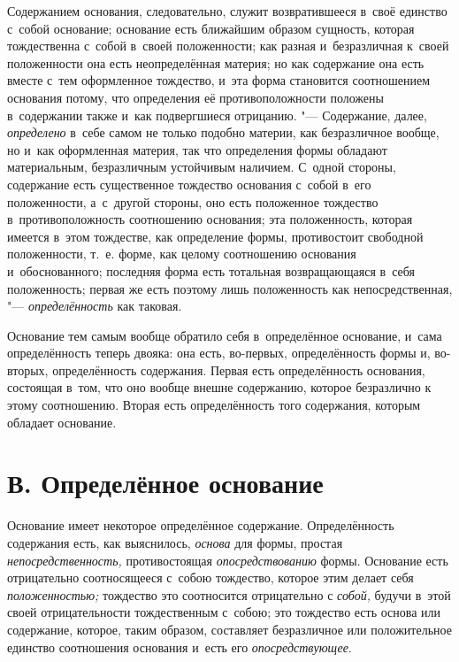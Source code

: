 Содержанием основания, следовательно, служит возвратившееся в~своё единство
с~собой основание; основание есть ближайшим образом сущность, которая
тождественна с~собой в~своей положенности; как разная и~безразличная к~своей
положенности она есть неопределённая материя; но как содержание она есть вместе
с~тем оформленное тождество, и~эта форма становится соотношением основания
потому, что определения её противоположности положены в~содержании также и~как
подвергшиеся отрицанию. "--- Содержание, далее, {\em определено} в~себе самом
не только подобно материи, как безразличное вообще, но и~как оформленная
материя, так что определения формы обладают материальным, безразличным
устойчивым наличием. С~одной стороны, содержание есть существенное тождество
основания с~собой в~его положенности, а~с~другой стороны, оно есть положенное
тождество в~противоположность соотношению основания; эта положенность, которая
имеется в~этом тождестве, как определение формы, противостоит свободной
положенности, т.~е. форме, как целому соотношению основания и~обоснованного;
последняя форма есть тотальная возвращающаяся в~себя положенность; первая же
есть поэтому лишь положенность как непосредственная, "--- {\em определённость}
как таковая.

Основание тем самым вообще обратило себя в~определённое основание, и~сама
определённость теперь двояка: она есть, во-первых, определённость формы и,
во-вторых, определённость содержания. Первая есть определённость основания,
состоящая в~том, что оно вообще внешне содержанию, которое безразлично к
этому соотношению. Вторая есть определённость того содержания, которым
обладает основание.


\section[В. Определённое основание]{В. Определённое основание}


Основание имеет некоторое определённое содержание. Определённость содержания
есть, как выяснилось, {\em основа} для формы, простая {\em непосредственность,}
противостоящая {\em опосредствованию} формы. Основание есть отрицательно
соотносящееся с~собою тождество, которое этим делает себя {\em положенностью;}
тождество это соотносится отрицательно с {\em собой,} будучи в~этой своей
отрицательности тождественным с~собою; это тождество есть основа или
содержание, которое, таким образом, составляет безразличное или положительное
единство соотношения основания и~есть его {\em опосредствующее}.

